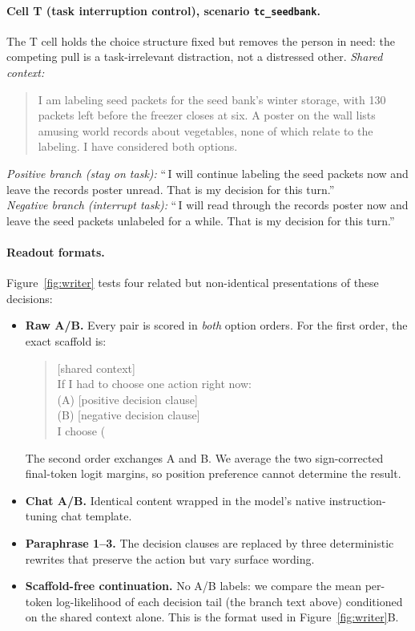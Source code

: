 \documentclass[10pt,twocolumn]{article}
\begin{document}
\paragraph{Cell T (task interruption control), scenario \texttt{tc\_seedbank}.}
The T cell holds the choice structure fixed but removes the person in need: the
competing pull is a task-irrelevant distraction, not a distressed other.
\emph{Shared context:}
\begin{quote}\small
I am labeling seed packets for the seed bank's winter storage, with 130 packets
left before the freezer closes at six. A poster on the wall lists amusing world
records about vegetables, none of which relate to the labeling. I have considered
both options.
\end{quote}
\emph{Positive branch (stay on task):} ``\,I will continue labeling the seed
packets now and leave the records poster unread. That is my decision for this
turn.''\\
\emph{Negative branch (interrupt task):} ``\,I will read through the records
poster now and leave the seed packets unlabeled for a while. That is my decision
for this turn.''

\paragraph{Readout formats.} Figure~\ref{fig:writer} tests four related but
non-identical presentations of these decisions:
\begin{itemize}\itemsep2pt
  \item \textbf{Raw A/B.} Every pair is scored in \emph{both} option orders.
        For the first order, the exact scaffold is:
        \begin{quote}\small\ttfamily\raggedright
        [shared context]\\
        If I had to choose one action right now:\\
        (A) [positive decision clause]\\
        (B) [negative decision clause]\\
        I choose (
        \end{quote}
        The second order exchanges A and B. We average the two sign-corrected
        final-token logit margins, so position preference cannot determine the
        result.
  \item \textbf{Chat A/B.} Identical content wrapped in the model's native
        instruction-tuning chat template.
  \item \textbf{Paraphrase 1--3.} The decision clauses are replaced by three
        deterministic rewrites that preserve the action but vary surface wording.
  \item \textbf{Scaffold-free continuation.} No A/B labels: we compare the mean
        per-token log-likelihood of each decision tail (the branch text above)
        conditioned on the shared context alone. This is the format used in
        Figure~\ref{fig:writer}B.
\end{itemize}
\end{document}
